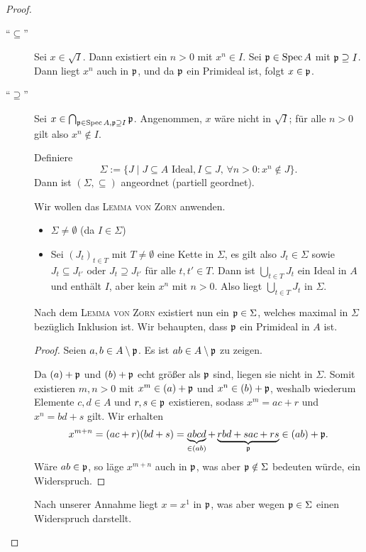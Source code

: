 \documentclass[12pt,a4paper]{scrartcl}
\theoremstyle{cplain}
\theoremstyle{cdef}
\begin{document}
\begin{proof}
    \leavevmode
    \begin{description}
        \item[\enquote{$\subseteq$}] Sei $x\in \sqrt{I}$. Dann existiert ein $n>0$ mit $x^n\in I$.
        Sei $\mathfrak{p}\in \operatorname{Spec} A$ mit $\mathfrak{p}\supseteq I$. Dann liegt $x^n$ auch in $\mathfrak{p}$, und da $\mathfrak{p}$ ein Primideal ist, folgt $x \in \mathfrak{p}$.
        \item[\enquote{$\supseteq$}] Sei $x\in \bigcap_{\mathfrak{p}\in \operatorname{Spec} A, \mathfrak{p}\supseteq I}\mathfrak{p}$. Angenommen, $x$ wäre nicht in $\sqrt{I}$; für alle $n>0$ gilt also $x^n\not \in I$.

        Definiere \[\Sigma := \{J \mid J\subseteq A \text{ Ideal}, I\subseteq J,\, \forall n>0: x^n\not \in J\}.\]
        Dann ist $(\Sigma, \subseteq)$ angeordnet (partiell geordnet).
        
        Wir wollen das \textsc{Lemma von Zorn} anwenden.
        \begin{itemize}
            \item $\Sigma \neq \emptyset$ (da $I\in \Sigma$)
            \item Sei $(J_t)_{t\in T}$ mit $T \neq \emptyset$ eine Kette in $\Sigma$, es gilt also $J_t \in \Sigma$ sowie $J_t \subseteq J_{t'}$ oder $J_t \supseteq J_{t'}$ für alle $t,t'\in T$.
            Dann ist $\bigcup_{t\in T} J_t$ ein Ideal in $A$ und enthält $I$, aber kein $x^n$ mit $n>0$. Also liegt $\bigcup_{t\in T} J_t$ in $\Sigma$.
        \end{itemize}
        
        Nach dem \textsc{Lemma von Zorn} existiert nun ein $\mathfrak{p} \in \Sigma$, welches maximal in $\Sigma$ bezüglich Inklusion ist. Wir behaupten, dass $\mathfrak{p}$ ein Primideal in $A$ ist.
        \begin{proof}
            Seien $a, b \in A \setminus \mathfrak{p}$. Es ist $ab\in A\setminus \mathfrak{p}$ zu zeigen.
            
            Da $(a)+\mathfrak{p}$ und $(b)+\mathfrak{p}$ echt größer als $\mathfrak{p}$ sind, liegen sie nicht in $\Sigma$. Somit existieren $m,n>0$ mit $x^m \in (a) + \mathfrak{p}$ und $x^n \in (b) + \mathfrak{p}$, weshalb wiederum Elemente $c,d\in A$ und $r,s \in \mathfrak{p}$ existieren, sodass $x^m = ac+r$ und $x^n = bd+s$ gilt. Wir erhalten \[x^{m+n} = (ac+r)(bd+s) = \underbrace{abcd}_{\in (ab)} + \underbrace{rbd + sac + rs}_{\mathfrak{p}} \in (ab)+\mathfrak{p}. \]
            Wäre $ab \in \mathfrak{p}$, so läge $x^{m+n}$ auch in $\mathfrak{p}$, was aber $\mathfrak{p} \notin \Sigma$ bedeuten würde, ein Widerspruch.
        \end{proof}

        Nach unserer Annahme liegt $x=x^1$ in $\mathfrak{p}$, was aber wegen $\mathfrak{p} \in \Sigma$ einen Widerspruch darstellt.
        \qedhere
    \end{description}
\end{proof}
\end{document}
